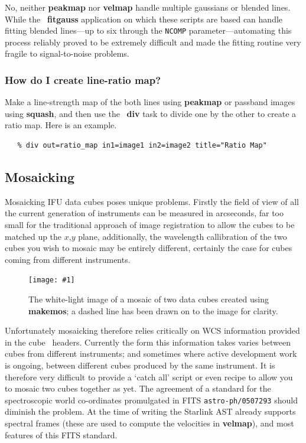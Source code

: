 \documentclass[twoside,11pt]{article}
\newcommand{\htmladdimg}[1]{}
\newcommand{\xref}[3]{#1}
\newcommand{\xlabel}[1]{}
\newcommand{\myfig} [5] {
  \begin{figure}
    \centering\texttt{[image: \#1]}
    \typeout{#1 inserted on page \arabic{page}}
    \caption{\label{#4}#5}
  \end{figure}
  }
\newcommand{\myfig}[5]{
    \label{#4} \htmladdimg{#3}\\
    Figure: #5\\
    }
\begin{document}
\begin{\htmlonly}
{No, neither \xref{{\bf peakmap}}{sun237}{peakmap} nor \xref{{\bf
velmap}}{sun237}{velmap} handle multiple gaussians or blended lines.
While the \FIGARO\ \xref{{\bf fitgauss}}{sun86}{FITGAUSS} application on
which these scripts are based can handle fitting blended lines---up to
six through the {\tt NCOMP} parameter---automating this process reliably
proved to be extremely difficult and made the fitting routine very
fragile to signal-to-noise problems.

\subsubsection{How do I create line-ratio map?}

Make a line-strength map of the both lines using \xref{{\bf
peakmap}}{sun237}{peakmap} or passband images using \xref{{\bf
squash}}{sun237}{squash}, and then use the \KAPPA\ 
\xref{{\bf div}}{sun95}{DIV} task to divide one by the other to create a
ratio map.  Here is an example.

\small\begin{verbatim}
   % div out=ratio_map in1=image1 in2=image2 title="Ratio Map"
\end{verbatim}\normalsize

\subsection{\xlabel{sc16_mos}Mosaicking\label{sc16_mos}}

Mosaicking IFU data cubes poses unique problems.  Firstly the
field of view of all the current generation of instruments can be
measured in arcseconds, far too small for the traditional approach of
image registration to allow the cubes to be matched up the $x$,$y$
plane, additionally, the wavelength callibration of the two cubes you
wish to mosaic may be entirely different, certainly the case for cubes
coming from different instruments.

\myfig{sc16_mosaic.eps}{height=0.4\textheight}{sc16_mosaic.gif}{sc16_mosaic_fig}{The
white-light image of a mosaic of two data cubes created using {\bf makemos};
a dashed line has been drawn on to the image for clarity.}

Unfortunately mosaicking therefore relies critically on WCS
information provided in the cube \FITSref\ headers.  Currently the form
this information takes varies between cubes from different
instruments; and sometimes where active development work is ongoing,
between different cubes produced by the same instrument.  It is
therefore very difficult to provide a `catch all' script or even
recipe to allow you to mosaic two cubes together as yet.  The
agreement of a standard for the spectroscopic world co-ordinates
promulgated in FITS {\tt astro-ph/0507293} should diminish the problem.
At the time of writing the Starlink \xref{AST}{sun210}{} already
supports spectral frames (these are used to compute the velocities in
{\bf velmap}), and most features of this FITS standard.

}
\end{\htmlonly}
\end{document}
